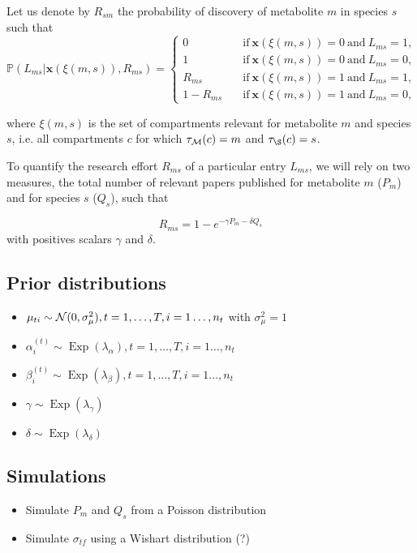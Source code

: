 \documentclass[a4paper,12pt]{article}
\DeclareMathOperator{\Exp}{Exp}
\def\P{\mathbb{P}}
\def\x{\boldsymbol{x}}
\def\N{{\cal N}}
\def\M{{\cal M}}
\begin{document}
 Let us denote by $R_{sm}$ the probability of discovery of metabolite $m$ in species $s$ such that
 \begin{equation*}
  \P(L_{ms}|\x(\xi(m,s)), R_{ms}) = \begin{cases}
                             0 \quad &\mathrm{if\ } \x(\xi(m,s))=0 \mathrm{\ and\ } L_{ms} = 1,\\
                             1 \quad &\mathrm{if\ } \x(\xi(m,s))=0 \mathrm{\ and\ } L_{ms} = 0,\\
                             R_{ms} \quad &\mathrm{if\ } \x(\xi(m,s))=1 \mathrm{\ and\ } L_{ms} = 1,\\
                             1- R_{ms} \quad &\mathrm{if\ } \x(\xi(m,s))=1 \mathrm{\ and\ } L_{ms} = 0,
                            \end{cases}
 \end{equation*}

 where $\xi(m,s)$ is the set of compartments relevant for metabolite $m$ and species $s$, i.e. all compartments $c$ for which $\tau_\M(c)=m$ and $\tau_\S(c)=s$.

 To quantify the research effort $R_{ms}$ of a particular entry $L_{ms}$, we will rely on two measures, the total number of relevant papers published for metabolite $m$ ($P_m$) and for species $s$ ($Q_s$), such that

 \begin{equation*}
 R_{ms} = 1 - e^{-\gamma P_m - \delta Q_s}
 \end{equation*}
with positives scalars $\gamma$ and $\delta$.


\subsection{Prior distributions}

\begin{itemize}
 \item $\mu_{ti} \sim \N(0, \sigma^2_\mu), t=1, \ldots, T, i=1\ldots, n_t$ with $\sigma^2_\mu=1$
 \item $\alpha^{(t)}_i \sim \Exp(\lambda_\alpha), t=1, \ldots, T, i=1\ldots, n_t$
 \item $\beta^{(t)}_i \sim \Exp(\lambda_\beta), t=1, \ldots, T, i=1\ldots, n_t$
 \item $\gamma \sim \Exp(\lambda_\gamma)$
 \item $\delta \sim \Exp(\lambda_\delta)$
\end{itemize}


\subsection{Simulations}

\begin{itemize}
 \item Simulate $P_m$ and $Q_s$ from a Poisson distribution
 \item Simulate $\sigma_{tf}$ using a Wishart distribution (?)
\end{itemize}



%
%
\end{document}
